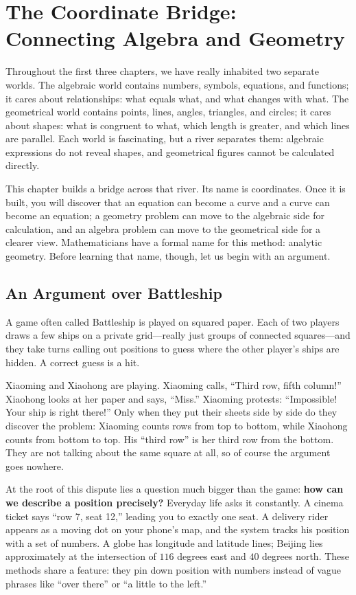 \chapter{The Coordinate Bridge: Connecting Algebra and Geometry}

Throughout the first three chapters, we have really inhabited two separate worlds. The algebraic world contains numbers, symbols, equations, and functions; it cares about relationships: what equals what, and what changes with what. The geometrical world contains points, lines, angles, triangles, and circles; it cares about shapes: what is congruent to what, which length is greater, and which lines are parallel. Each world is fascinating, but a river separates them: algebraic expressions do not reveal shapes, and geometrical figures cannot be calculated directly.

This chapter builds a bridge across that river. Its name is coordinates. Once it is built, you will discover that an equation can become a curve and a curve can become an equation; a geometry problem can move to the algebraic side for calculation, and an algebra problem can move to the geometrical side for a clearer view. Mathematicians have a formal name for this method: analytic geometry. Before learning that name, though, let us begin with an argument.

\section{An Argument over Battleship}

A game often called Battleship is played on squared paper. Each of two players draws a few ships on a private grid---really just groups of connected squares---and they take turns calling out positions to guess where the other player's ships are hidden. A correct guess is a hit.

Xiaoming and Xiaohong are playing. Xiaoming calls, ``Third row, fifth column!'' Xiaohong looks at her paper and says, ``Miss.'' Xiaoming protests: ``Impossible! Your ship is right there!'' Only when they put their sheets side by side do they discover the problem: Xiaoming counts rows from top to bottom, while Xiaohong counts from bottom to top. His ``third row'' is her third row from the bottom. They are not talking about the same square at all, so of course the argument goes nowhere.

At the root of this dispute lies a question much bigger than the game: \textbf{how can we describe a position precisely?} Everyday life asks it constantly. A cinema ticket says ``row 7, seat 12,'' leading you to exactly one seat. A delivery rider appears as a moving dot on your phone's map, and the system tracks his position with a set of numbers. A globe has longitude and latitude lines; Beijing lies approximately at the intersection of $116$ degrees east and $40$ degrees north. These methods share a feature: they pin down position with numbers instead of vague phrases like ``over there'' or ``a little to the left.''

